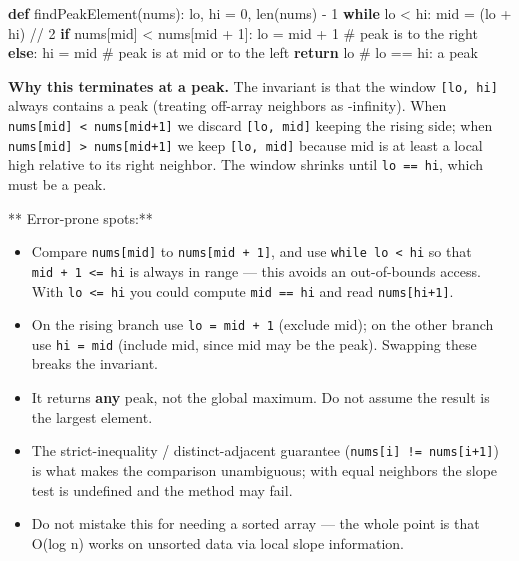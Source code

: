 \documentclass[11pt]{article}
\providecommand{\tightlist}{\setlength{\itemsep}{1pt}\setlength{\parskip}{0pt}}
\newenvironment{Shaded}{\begin{snugshade}}{\end{snugshade}}
\newcommand{\BuiltInTok}[1]{\textcolor[rgb]{0.50,0.55,0.55}{#1}}
\newcommand{\CommentTok}[1]{\textcolor[rgb]{0.48,0.49,0.49}{#1}}
\newcommand{\ControlFlowTok}[1]{\textcolor[rgb]{0.99,0.74,0.29}{\textbf{#1}}}
\newcommand{\DecValTok}[1]{\textcolor[rgb]{0.96,0.45,0.00}{#1}}
\newcommand{\KeywordTok}[1]{\textcolor[rgb]{0.81,0.81,0.76}{\textbf{#1}}}
\newcommand{\NormalTok}[1]{\textcolor[rgb]{0.81,0.81,0.76}{#1}}
\newcommand{\OperatorTok}[1]{\textcolor[rgb]{0.81,0.81,0.76}{#1}}
\begin{document}

\begin{Shaded}
\begin{Highlighting}[]
\KeywordTok{def}\NormalTok{ findPeakElement(nums):}
\NormalTok{    lo, hi }\OperatorTok{=} \DecValTok{0}\NormalTok{, }\BuiltInTok{len}\NormalTok{(nums) }\OperatorTok{{-}} \DecValTok{1}
    \ControlFlowTok{while}\NormalTok{ lo }\OperatorTok{\textless{}}\NormalTok{ hi:}
\NormalTok{        mid }\OperatorTok{=}\NormalTok{ (lo }\OperatorTok{+}\NormalTok{ hi) }\OperatorTok{//} \DecValTok{2}
        \ControlFlowTok{if}\NormalTok{ nums[mid] }\OperatorTok{\textless{}}\NormalTok{ nums[mid }\OperatorTok{+} \DecValTok{1}\NormalTok{]:}
\NormalTok{            lo }\OperatorTok{=}\NormalTok{ mid }\OperatorTok{+} \DecValTok{1}        \CommentTok{\# peak is to the right}
        \ControlFlowTok{else}\NormalTok{:}
\NormalTok{            hi }\OperatorTok{=}\NormalTok{ mid            }\CommentTok{\# peak is at mid or to the left}
    \ControlFlowTok{return}\NormalTok{ lo                    }\CommentTok{\# lo == hi: a peak}
\end{Highlighting}
\end{Shaded}

\textbf{Why this terminates at a peak.} The invariant is that the window \texttt{{[}lo,\ hi{]}} always contains a peak (treating off-array neighbors as -infinity). When \texttt{nums{[}mid{]}\ \textless{}\ nums{[}mid+1{]}} we discard \texttt{{[}lo,\ mid{]}} keeping the rising side; when \texttt{nums{[}mid{]}\ \textgreater{}\ nums{[}mid+1{]}} we keep \texttt{{[}lo,\ mid{]}} because mid is at least a local high relative to its right neighbor. The window shrinks until \texttt{lo\ ==\ hi}, which must be a peak.

** Error-prone spots:**

\begin{itemize}
\tightlist
\item
  Compare \texttt{nums{[}mid{]}} to \texttt{nums{[}mid\ +\ 1{]}}, and use \texttt{while\ lo\ \textless{}\ hi} so that \texttt{mid\ +\ 1\ \textless{}=\ hi} is always in range --- this avoids an out-of-bounds access. With \texttt{lo\ \textless{}=\ hi} you could compute \texttt{mid\ ==\ hi} and read \texttt{nums{[}hi+1{]}}.
\item
  On the rising branch use \texttt{lo\ =\ mid\ +\ 1} (exclude mid); on the other branch use \texttt{hi\ =\ mid} (include mid, since mid may be the peak). Swapping these breaks the invariant.
\item
  It returns \textbf{any} peak, not the global maximum. Do not assume the result is the largest element.
\item
  The strict-inequality / distinct-adjacent guarantee (\texttt{nums{[}i{]}\ !=\ nums{[}i+1{]}}) is what makes the comparison unambiguous; with equal neighbors the slope test is undefined and the method may fail.
\item
  Do not mistake this for needing a sorted array --- the whole point is that O(log n) works on unsorted data via local slope information.
\end{itemize}
\end{document}
